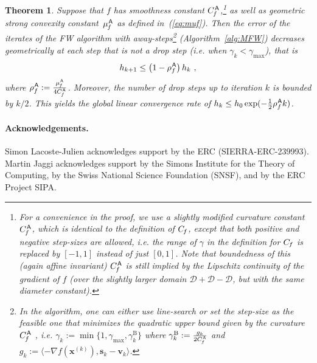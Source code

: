 \documentclass{article} %
\newtheorem{theorem}[definition]{Theorem}
\newcommand{\domain}{\mathcal{D}}
\newcommand{\stepsize}{\gamma}
\newcommand{\stepmax}{\stepsize_{\textrm{max}}} %
\newcommand{\stepbound}{\stepsize^\textrm{B}} %
\newcommand{\away}{{\hspace{0.06em}\textsf{A}}}
\newcommand{\Cf}{C_{\hspace{-0.08em}f}}
\newcommand{\CfMFW}{C_{\hspace{-0.08em}f}^\away}
\newcommand{\strongConvMFW}{\mu_{\hspace{-0.08em}f}^\away}
\newcommand{\x}{\bm{x}}
\newcommand{\s}{\bm{s}}
\newcommand{\vv}{\bm{v}} %
\newcommand{\0}{\mathbf{0}} %
\begin{document}
\begin{theorem}\label{thm:linear_convergenceMFW}
Suppose that $f$ has smoothness constant $\CfMFW$,\footnote{%
For a convenience in the proof, we use a slightly modified curvature constant $\CfMFW$, which is identical to the definition of $\Cf$, except that both positive and negative step-sizes are allowed, i.e. the range of $\stepsize$ in the definition for $\Cf$ is replaced by $[-1,1]$ instead of just $[0,1]$. 
Note that boundedness of this (again affine invariant) $\CfMFW$ is still implied by the Lipschitz continuity of the gradient of $f$ (over the slightly larger domain $\domain + \domain - \domain$, but with the same diameter constant).}%
%
as well as geometric strong convexity constant~$\strongConvMFW$ as defined in~(\ref{eq:muf}).
%
Then the error of the iterates of the FW algorithm with away-steps\footnote{%
In the algorithm, one can either use line-search or set the step-size as the feasible one that minimizes the quadratic upper bound given by the curvature $\CfMFW$%
, i.e. $\stepsize_k := \min\{1,\stepmax, \stepbound_k\}$ where $\stepbound_k := \frac{g_k}{2\CfMFW}$ and\vspace{-2mm} $g_k :=  \langle  -\nabla f(\x^{(k)}), \s_k - \vv_k \rangle$.
}
%
(Algorithm~\ref{alg:MFW})
decreases geometrically at each step that is not a drop step (i.e. when $\stepsize_k < \stepmax$), that is\vspace{-2mm}
\[
h_{k+1} \leq \left(1-\rho_f^\away\right) h_k \ ,\vspace{-2mm}
\]
where $\rho_f^\away := \frac{\strongConvMFW}{4\CfMFW}$. 
%
Moreover, the number of drop steps up to iteration $k$ is bounded by $k/2$. %
This yields the global linear convergence rate of $h_k \leq h_0 \exp(-\frac12 \rho_f^\away k)$.
\end{theorem}




\paragraph{Acknowledgements.}
Simon Lacoste-Julien acknowledges support by the ERC (SIERRA-ERC-239993).
Martin Jaggi acknowledges support
by the Simons Institute for the Theory of Computing,
by the Swiss National Science Foundation (SNSF), 
and by the ERC Project SIPA. 


%
{\small

}%




%

\newpage
%
%
%
\appendix
\end{document}
